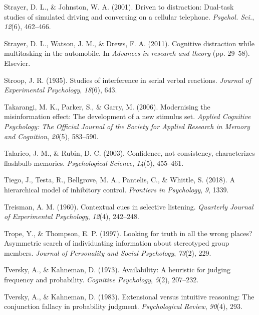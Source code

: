 \documentclass[
]{krantz}
\newlength{\cslhangindent}
\newlength{\cslentryspacingunit} %
\newenvironment{CSLReferences}[2] %
 {%
  \setlength{\parindent}{0pt}
  \ifodd #1
  \let\oldpar\par
  \def\par{\hangindent=\cslhangindent\oldpar}
  \fi
  \setlength{\parskip}{#2\cslentryspacingunit}
 }%
 {}
\begin{document}
\begin{CSLReferences}{1}{0}
\leavevmode{}%
Strayer, D. L., \& Johnston, W. A. (2001). Driven to distraction: Dual-task studies of simulated driving and conversing on a cellular telephone. \emph{Psychol. Sci.}, \emph{12}(6), 462--466.

\leavevmode{}%
Strayer, D. L., Watson, J. M., \& Drews, F. A. (2011). Cognitive distraction while multitasking in the automobile. In \emph{Advances in research and theory} (pp. 29--58). Elsevier.

\leavevmode{}%
Stroop, J. R. (1935). Studies of interference in serial verbal reactions. \emph{Journal of Experimental Psychology}, \emph{18}(6), 643.

\leavevmode{}%
Takarangi, M. K., Parker, S., \& Garry, M. (2006). Modernising the misinformation effect: The development of a new stimulus set. \emph{Applied Cognitive Psychology: The Official Journal of the Society for Applied Research in Memory and Cognition}, \emph{20}(5), 583--590.

\leavevmode{}%
Talarico, J. M., \& Rubin, D. C. (2003). Confidence, not consistency, characterizes flashbulb memories. \emph{Psychological Science}, \emph{14}(5), 455--461.

\leavevmode{}%
Tiego, J., Testa, R., Bellgrove, M. A., Pantelis, C., \& Whittle, S. (2018). A hierarchical model of inhibitory control. \emph{Frontiers in Psychology}, \emph{9}, 1339.

\leavevmode{}%
Treisman, A. M. (1960). Contextual cues in selective listening. \emph{Quarterly Journal of Experimental Psychology}, \emph{12}(4), 242--248.

\leavevmode{}%
Trope, Y., \& Thompson, E. P. (1997). Looking for truth in all the wrong places? Asymmetric search of individuating information about stereotyped group members. \emph{Journal of Personality and Social Psychology}, \emph{73}(2), 229.

\leavevmode{}%
Tversky, A., \& Kahneman, D. (1973). Availability: A heuristic for judging frequency and probability. \emph{Cognitive Psychology}, \emph{5}(2), 207--232.

\leavevmode{}%
Tversky, A., \& Kahneman, D. (1983). Extensional versus intuitive reasoning: The conjunction fallacy in probability judgment. \emph{Psychological Review}, \emph{90}(4), 293.


\end{CSLReferences}
\end{document}

